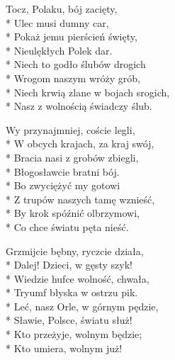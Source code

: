 \begin{lyrics}[longestline={Niech krwią zlane w bojach srogich,}]
\chorusref

Tocz, Polaku, bój zacięty,\\*
Ulec musi dumny car,\\*
Pokaż jemu pierścień święty,\\*
Nieulękłych Polek dar.\\*
Niech to godło ślubów drogich\\*
Wrogom naszym wróży grób,\\*
Niech krwią zlane w bojach srogich,\\*
Nasz z wolnością świadczy ślub.

\chorusref

Wy przynajmniej, coście legli,\\*
W obcych krajach, za kraj swój,\\*
Bracia nasi z grobów zbiegli,\\*
Błogosławcie bratni bój.\\*
Bo zwyciężyć my gotowi\\*
Z trupów naszych tamę wznieść,\\*
By krok spóźnić olbrzymowi,\\*
Co chce światu pęta nieść.

\chorusref

Grzmijcie bębny, ryczcie działa,\\*
Dalej! Dzieci, w gęsty szyk!\\*
Wiedzie hufce wolność, chwała,\\*
Tryumf błyska w ostrzu pik.\\*
Leć, nasz Orle, w górnym pędzie,\\*
Sławie, Polsce, światu służ!\\*
Kto przeżyje, wolnym będzie;\\*
Kto umiera, wolnym już!

\chorusref
\end{lyrics}


